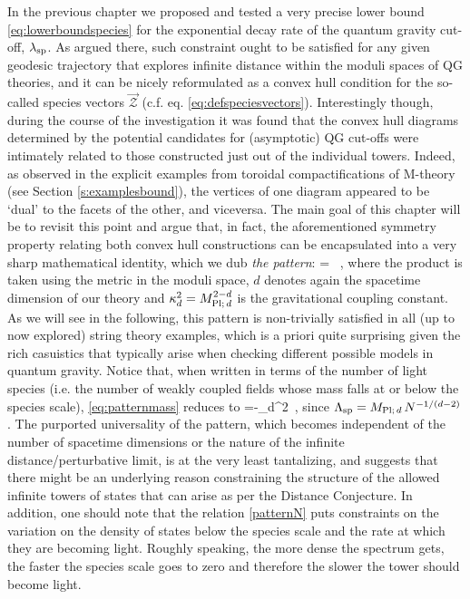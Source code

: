 

In the previous chapter we proposed and tested a very precise lower bound \eqref{eq:lowerboundspecies} for the exponential decay rate of the quantum gravity cut-off, $\lambda_{\rm sp}$. As argued there, such constraint ought to be satisfied for any given geodesic trajectory that explores infinite distance within the moduli spaces of QG theories, and it can be nicely reformulated as a convex hull condition for the so-called species vectors $\vec{\mathcal{Z}}$ (c.f. eq. \eqref{eq:defspeciesvectors}). Interestingly though, during the course of the investigation it was found that the convex hull diagrams determined by the potential candidates for (asymptotic) QG cut-offs were intimately related to those constructed just out of the individual towers. Indeed, as observed in the explicit examples from toroidal compactifications of M-theory (see Section \ref{s:examplesbound}), the vertices of one diagram appeared to be `dual' to the facets of the other, and viceversa. The main goal of this chapter will be to revisit this point and argue that, in fact, the aforementioned symmetry property relating both convex hull constructions can be encapsulated into a very sharp mathematical identity, which we dub \emph{the pattern}:
%
\beq \label{eq:patternmass}
	 \cdot\frac{\vec\nabla \LSP}{\LSP}= \, ,
\eeq
%
where the product is taken using the metric in the moduli space, $d$ denotes again the spacetime dimension of our theory and $\kappa_d^2= M_{\text{Pl;}\, d}^{2-d}$ is the gravitational coupling constant. As we will see in the following, this pattern is non-trivially satisfied in all (up to now explored) string theory examples, which is a priori quite surprising given the rich casuistics that typically arise when checking different possible models in quantum gravity. Notice that, when written in terms of the number of light species (i.e. the number of weakly coupled fields whose mass falls at or below the species scale), \eqref{eq:patternmass} reduces to
%
\beq
\label{patternN}
	 \cdot{}=-\kappa_d^2\, ,
\eeq
%
since $\Lambda_{\text{sp}}=M_{\text{Pl};\, d}\, N^{-1/(d-2)}$. The purported universality of the pattern, which becomes independent of the number of spacetime dimensions or the nature of the infinite distance/perturbative limit, is at the very least tantalizing, and suggests that there might be an underlying reason constraining the structure of the allowed infinite towers of states that can arise as per the Distance Conjecture. In addition, one should note that the relation \eqref{patternN} puts constraints on the variation on the density of states below the species scale and the rate at which they are becoming light. Roughly speaking, the more dense the spectrum gets, the faster the species scale goes to zero and therefore the slower the tower should become light.
	
